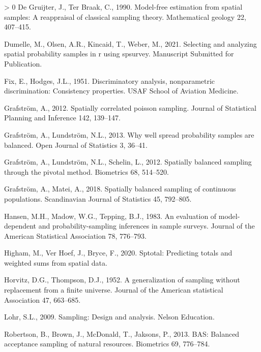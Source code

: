 \documentclass[]{elsarticle} %
\newlength{\cslhangindent}
\newenvironment{CSLReferences}[3] %
 {%
  \setlength{\parindent}{0pt}
  \ifodd #1 \everypar{\setlength{\hangindent}{\cslhangindent}}\ignorespaces\fi
  \ifnum #2 > 0
  \setlength{\parskip}{#2\baselineskip}
  \fi
 }%
 {}
\begin{document}
\begin{CSLReferences}{1}{0}
\leavevmode\hypertarget{ref-de1990model}{}%
De Gruijter, J., Ter Braak, C., 1990. Model-free estimation from spatial
samples: A reappraisal of classical sampling theory. Mathematical
geology 22, 407--415.

\leavevmode\hypertarget{ref-dumelle2021spsurvey}{}%
Dumelle, M., Olsen, A.R., Kincaid, T., Weber, M., 2021. Selecting and
analyzing spatial probability samples in r using spsurvey. Manuscript
Submitted for Publication.

\leavevmode\hypertarget{ref-fix1951discriminatory}{}%
Fix, E., Hodges, J.L., 1951. Discriminatory analysis, nonparametric
discrimination: Consistency properties. USAF School of Aviation
Medicine.

\leavevmode\hypertarget{ref-grafstrom2012spatiallypoisson}{}%
Grafström, A., 2012. Spatially correlated poisson sampling. Journal of
Statistical Planning and Inference 142, 139--147.

\leavevmode\hypertarget{ref-grafstrom2013well}{}%
Grafström, A., Lundström, N.L., 2013. Why well spread probability
samples are balanced. Open Journal of Statistics 3, 36--41.

\leavevmode\hypertarget{ref-grafstrom2012spatially}{}%
Grafström, A., Lundström, N.L., Schelin, L., 2012. Spatially balanced
sampling through the pivotal method. Biometrics 68, 514--520.

\leavevmode\hypertarget{ref-grafstrom2018spatially}{}%
Grafström, A., Matei, A., 2018. Spatially balanced sampling of
continuous populations. Scandinavian Journal of Statistics 45, 792--805.

\leavevmode\hypertarget{ref-hansen1983evaluation}{}%
Hansen, M.H., Madow, W.G., Tepping, B.J., 1983. An evaluation of
model-dependent and probability-sampling inferences in sample surveys.
Journal of the American Statistical Association 78, 776--793.

\leavevmode\hypertarget{ref-higham2020sptotal}{}%
Higham, M., Ver Hoef, J., Bryce, F., 2020. Sptotal: Predicting totals
and weighted sums from spatial data.

\leavevmode\hypertarget{ref-horvitz1952generalization}{}%
Horvitz, D.G., Thompson, D.J., 1952. A generalization of sampling
without replacement from a finite universe. Journal of the American
statistical Association 47, 663--685.

\leavevmode\hypertarget{ref-lohr2009sampling}{}%
Lohr, S.L., 2009. Sampling: Design and analysis. Nelson Education.

\leavevmode\hypertarget{ref-robertson2013bas}{}%
Robertson, B., Brown, J., McDonald, T., Jaksons, P., 2013. BAS: Balanced
acceptance sampling of natural resources. Biometrics 69, 776--784.


\end{CSLReferences}
\end{document}
